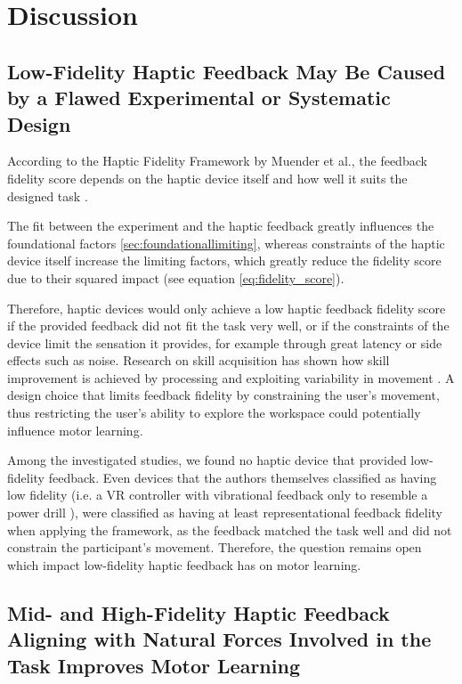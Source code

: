 \section{Discussion}

\subsection{Low-Fidelity Haptic Feedback May Be Caused by a Flawed Experimental or Systematic Design}
According to the Haptic Fidelity Framework by Muender et al., the feedback fidelity score depends on the haptic device itself and how well it suits the designed task \cite{Muender2022HapticReality}. 

The fit between the experiment and the haptic feedback greatly influences the foundational factors \ref{sec:foundationallimiting}, whereas constraints of the haptic device itself increase the limiting factors, which greatly reduce the fidelity score due to their squared impact (see equation \ref{eq:fidelity_score}).

Therefore, haptic devices would only achieve a low haptic feedback fidelity score if the provided feedback did not fit the task very well, or if the constraints of the device limit the sensation it provides, for example through great latency or side effects such as noise. Research on skill acquisition has shown how skill improvement is achieved by processing and exploiting variability in movement \cite{Sternad2018ItsLearning}. A design choice that limits feedback fidelity by constraining the user's movement, thus restricting the user's ability to explore the workspace could potentially influence motor learning.

Among the investigated studies, we found no haptic device that provided low-fidelity feedback. Even devices that the authors themselves classified as having low fidelity (i.e. a VR controller with vibrational feedback only to resemble a power drill \cite{Yang2023}), were classified as having at least representational feedback fidelity when applying the framework, as the feedback matched the task well and did not constrain the participant's movement.
Therefore, the question remains open which impact low-fidelity haptic feedback has on motor learning.


\subsection{Mid- and High-Fidelity Haptic Feedback Aligning with Natural Forces Involved in the Task Improves Motor Learning}

